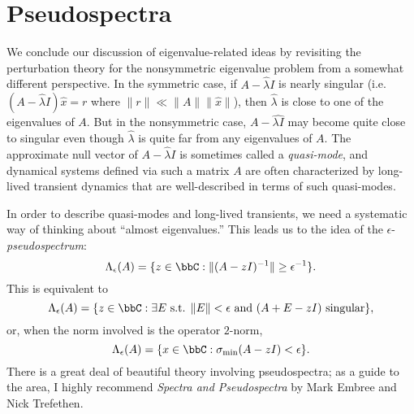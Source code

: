 \section{Pseudospectra}

We conclude our discussion of eigenvalue-related ideas by revisiting the
perturbation theory for the nonsymmetric eigenvalue problem from a
somewhat different perspective.  In the symmetric case, if $A-\hat{\lambda} I$
is nearly singular (i.e. $(A-\hat{\lambda} I) \hat{x} = r$ where
$\|r\| \ll \|A\|\|\hat{x}\|$), then $\hat{\lambda}$ is close to one of the
eigenvalues of $A$.  But in the nonsymmetric case, $A-\hat{\lambda I}$ may
become quite close to singular even though $\hat{\lambda}$ is quite far
from any eigenvalues of $A$.  The approximate null vector of $A-\hat{\lambda} I$
is sometimes called a {\em quasi-mode}, and dynamical systems defined via
such a matrix $A$ are often characterized by long-lived transient dynamics
that are well-described in terms of such quasi-modes.

In order to describe quasi-modes and long-lived transients, we need a
systematic way of thinking about ``almost eigenvalues.''  This leads
us to the idea of the $\epsilon$-{\em pseudospectrum}:
\[
  \Lambda_{\epsilon}(A) = \{z \in \bbC : \|(A-zI)^{-1}\| \geq \epsilon^{-1}\}.
\]
This is equivalent to
\[
  \Lambda_{\epsilon}(A) = \{ z \in \bbC : \exists E \mbox{ s.t. } \|E\| < \epsilon \mbox{ and }(A+E-zI) \mbox{ singular} \},
\]
or, when the norm involved is the operator $2$-norm,
\[
  \Lambda_{\epsilon}(A) = \{ x \in \bbC : \sigma_{\min}(A-zI) < \epsilon \}.
\]
There is a great deal of beautiful theory involving pseudospectra; as a
guide to the area, I highly recommend {\em Spectra and Pseudospectra}
by Mark Embree and Nick Trefethen.
